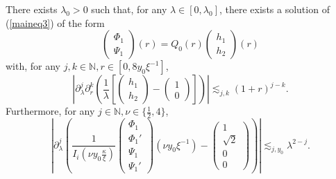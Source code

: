 \documentclass[10pt,a4paper]{amsart}
\begin{document}
\begin{lem}
  \label{latecheckout}There exists $\lambda_0 > 0$ such that, for any $\lambda
  \in [0, \lambda_0]$, there exists a solution of (\ref{maineq3}) of the form
  \[ \left(\begin{array}{c}
       \Phi_1\\
       \Psi_1
     \end{array}\right) (r) = Q_0 (r) \left(\begin{array}{c}
       h_1\\
       h_2
     \end{array}\right) (r) \]
  with, for any $j, k \in \mathbb{N}, r \in [0, 8 y_0 \xi^{- 1}]$,
  \[ \left| \partial_{\lambda}^j \partial_r^k \left(
     \frac{1}{\lambda} \left[\left(\begin{array}{c}
       h_1\\
       h_2
     \end{array}\right) - \left(\begin{array}{c}
       1\\
       0
     \end{array}\right) \right] \right) \right| \lesssim_{j, k} (1 + r)^{j -
     k} . \]
  Furthermore, for any $j \in \mathbb{N} , \nu \in \{ \frac 12,4 \}$,
  \[ \left| \partial_{\lambda}^j \left( \frac{1}{I_i \left( \nu y_0
     \frac{\kappa}{\xi} \right)} \left(\begin{array}{c}
       \Phi_1\\
       \Phi_1'\\
       \Psi_1\\
       \Psi_1'
     \end{array}\right) (\nu y_0\xi^{- 1}) - \left(\begin{array}{c}
       1\\
       \sqrt{2}\\
       0\\
       0
     \end{array}\right) \right) \right| \lesssim_{j,y_0} \lambda^{2-j} .
  \]
  \[ \  \]
\end{lem}
\end{document}
